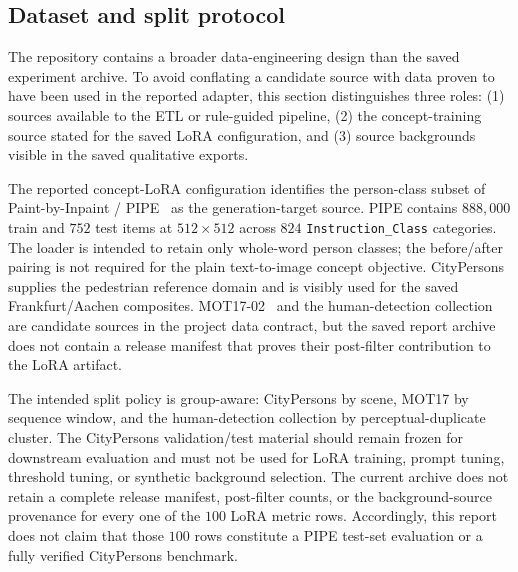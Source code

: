 \documentclass[11pt,a4paper]{article}
\begin{document}
\subsection{Dataset and split protocol}\label{sec:dataset}
The repository contains a broader data-engineering design than the saved experiment
archive. To avoid conflating a candidate source with data proven to have
been used in the reported adapter, this section distinguishes three roles:
(1) sources available to the ETL or rule-guided pipeline, (2) the concept-training
source stated for the saved LoRA configuration, and (3) source backgrounds visible
in the saved qualitative exports.

The reported concept-LoRA configuration identifies the person-class subset of
Paint-by-Inpaint / PIPE~\cite{pipe} as the generation-target source. PIPE contains
$888{,}000$ train and $752$ test items at $512\times512$ across $824$
\texttt{Instruction\_Class} categories. The loader is intended to retain only
whole-word person classes; the before/after pairing is not required for the plain
text-to-image concept objective. CityPersons~\cite{citypersons} supplies the
pedestrian reference domain and is visibly used for the saved Frankfurt/Aachen
composites. MOT17-02~\cite{mot17} and the human-detection collection are candidate
sources in the project data contract, but the saved report archive does not contain
a release manifest that proves their post-filter contribution to the LoRA artifact.

The intended split policy is group-aware: CityPersons by scene, MOT17 by sequence
window, and the human-detection collection by perceptual-duplicate cluster. The
CityPersons validation/test material should remain frozen for downstream evaluation
and must not be used for LoRA training, prompt tuning, threshold tuning, or synthetic
background selection. The current archive does not retain a complete release
manifest, post-filter counts, or the background-source provenance for every one of
the $100$ LoRA metric rows. Accordingly, this report does not claim that those
$100$ rows constitute a PIPE test-set evaluation or a fully verified CityPersons
benchmark.
\end{document}
